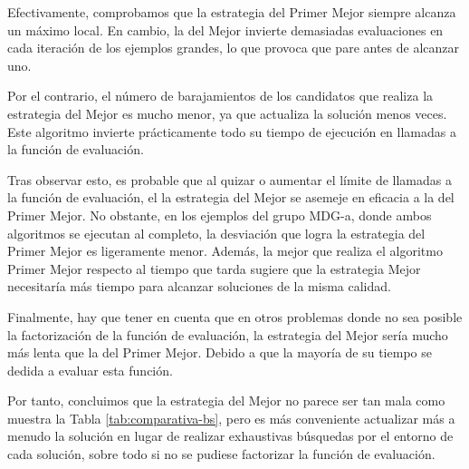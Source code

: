 \documentclass{article}
\begin{document}
Efectivamente, comprobamos que la estrategia del Primer Mejor siempre alcanza un máximo local. En cambio, la del Mejor
invierte demasiadas evaluaciones en cada iteración de los ejemplos grandes, lo que provoca que pare antes de alcanzar uno.

Por el contrario, el número de barajamientos de los candidatos que realiza la estrategia del Mejor es mucho menor, ya que
actualiza la solución menos veces. Este algoritmo invierte prácticamente todo su tiempo de ejecución en llamadas a la función
de evaluación.

Tras observar esto, es probable que al quizar o aumentar el límite de llamadas a la función de evaluación, el la estrategia del 
Mejor se asemeje en eficacia a la del Primer Mejor. No obstante, en los ejemplos del grupo MDG-a, donde ambos algoritmos se
 ejecutan al completo, la desviación que logra
la estrategia del Primer Mejor es ligeramente menor. Además, la mejor que realiza el algoritmo Primer Mejor respecto al tiempo que
tarda sugiere que la estrategia Mejor necesitaría más tiempo para alcanzar soluciones de la misma calidad.

Finalmente, hay que tener en cuenta que en otros problemas donde no sea posible la factorización de la función de evaluación,
la estrategia del Mejor sería mucho más lenta que la del Primer Mejor. Debido a que la mayoría de su tiempo se dedida a evaluar
esta función.

Por tanto, concluimos que la estrategia del Mejor no parece ser tan mala como muestra la Tabla \ref{tab:comparativa-bs}, pero
es más conveniente actualizar más a menudo la solución en lugar de realizar exhaustivas búsquedas por el entorno de cada solución,
sobre todo si no se pudiese factorizar la función de evaluación.
\end{document}
